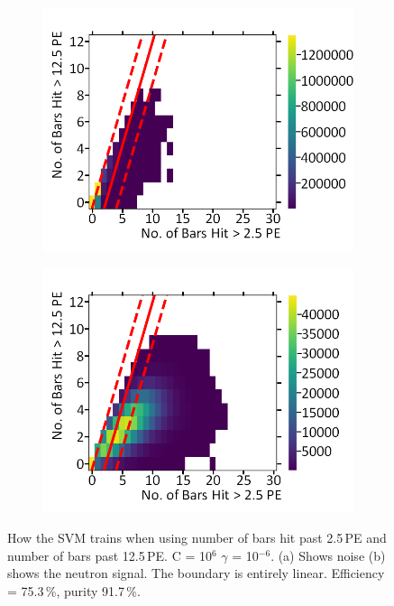 \begin{figure}[!h]
\centering
\begin{subfigure}{.5\textwidth}
  \centering
  \includegraphics[width=\linewidth]{Appendix1/Figs/Bars1Bars2Noise.png}
  \captionsetup{width=.9\linewidth}
  \caption{}
  \label{subFig:Bars1Bars2N}
\end{subfigure}%
\begin{subfigure}{.5\textwidth}
  \centering
\includegraphics[width=\linewidth]{Appendix1/Figs/Bars1Bars2Signal.png}
  \captionsetup{width=.9\linewidth}
  \caption{}
  \label{subFig:Bars1Bar2S}
\end{subfigure}
\caption[LIBLINEAR SVM Nyström approximated RBF kernel for number of bars hit > 12.5\,PE vs number of bars hit > 2.5\,PE.]{How the SVM trains when using number of bars hit past 2.5\,PE and number of bars past 12.5\,PE. C = 10$^6$ $\gamma$ = 10$^{-6}$. (a) Shows noise (b) shows the neutron signal. The boundary is entirely linear. Efficiency = 75.3\,\%, purity 91.7\,\%.}
\label{fig:Bars1BarsSN}
\end{figure}

